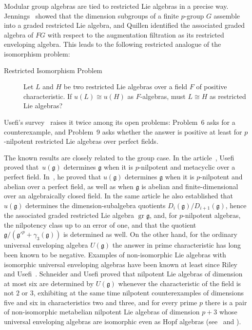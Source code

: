 \documentclass[11pt,reqno]{amsart}
\theoremstyle{plain}
\theoremstyle{remark}
\newcommand{\gr}{\operatorname{gr}}
\begin{document}
Modular group algebras are tied to restricted Lie algebras in a precise way.
Jennings~\cite{Jennings} showed that the dimension subgroups of a finite
$p$-group $G$ assemble into a graded restricted Lie algebra, and Quillen
\cite{Quillen} identified the associated graded algebra of $FG$ with respect
to the augmentation filtration as its restricted enveloping algebra. 
This leads to the following restricted analogue of the isomorphism problem: 
\begin{description}
	\item[Restricted Isomorphism Problem]
		Let $L$ and $H$ be two restricted Lie algebras over a field $F$ of positive characteristic.
		If $u(L)\cong u(H)$ as $F$-algebras, must $L\cong H$ as restricted Lie algebras?
\end{description}
Usefi's survey~\cite{UsefiSurvey} raises it twice among its open problems:
Problem~6 asks for a counterexample, and Problem~9 asks whether the answer is
positive at least for $p$-nilpotent restricted Lie algebras over perfect
fields.

The known results are closely related to the group case. In the article~\cite{UsefiPAMS},
Usefi proved that~$u(\mathfrak{g})$ determines $\mathfrak{g}$ when it is $p$-nilpotent and metacyclic
over a perfect field. In~\cite{UsefiPacific}, he proved that $u(\mathfrak{g})$ determines
$\mathfrak{g}$ when it is $p$-nilpotent and abelian over a perfect field, as well as when
$\mathfrak{g}$ is abelian and finite-dimensional over an algebraically closed field. In the
same article he also established that $u(\mathfrak{g})$ determines the
dimension-subalgebra quotients $D_i(\mathfrak{g})/D_{i+1}(\mathfrak{g})$, hence the associated
graded restricted Lie algebra $\gr \mathfrak{g}$, and, for $p$-nilpotent algebras,
the nilpotency class up to an error of one, and that
the quotient
$\mathfrak{g}/({\mathfrak{g}'}^{p}+\gamma_3(\mathfrak{g}))$ is determined as well. On the other hand, for the ordinary universal
enveloping algebra $U(\mathfrak{g})$ the answer in prime characteristic
has long been known to be negative. Examples of non-isomorphic Lie algebras
with isomorphic universal enveloping algebras have been known at least since
Riley and Usefi~\cite[Example~A]{RileyUsefi}. Schneider and Usefi
\cite{SchneiderUsefi} proved that nilpotent Lie algebras of dimension at most
six are determined by $U(\mathfrak{g})$ whenever the characteristic of the field is not $2$ or $3$, exhibiting at the same time nilpotent
counterexamples of dimensions five and six in characteristics two and three,
and for every prime $p$ there is a pair of non-isomorphic metabelian
nilpotent Lie algebras of dimension $p+3$ whose universal enveloping algebras
are isomorphic even as Hopf algebras (see~\cite{SchneiderUsefi} and
\cite[Example~6.1]{UsefiSurvey}).
\end{document}
